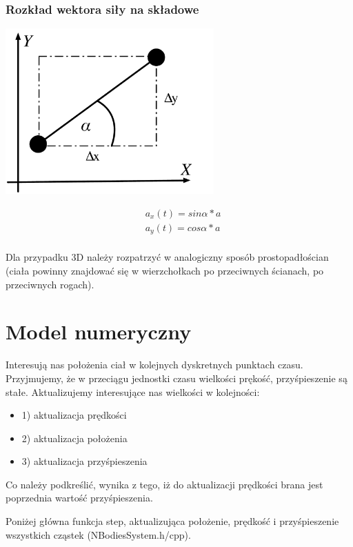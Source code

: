 \documentclass[fleqn]{article}
\begin{document}
\begin{frame}
\frametitle{Rozkład wektora siły na składowe}
\begin{center}
\includegraphics[width=8cm]{rozkladsil.pdf}
\end{center}
\end{frame}

\begin{align*}
    &a_{x}(t) = sin\alpha * a \\
    &a_{y}(t) = cos\alpha * a \\
\end{align*}

Dla przypadku 3D należy rozpatrzyć w analogiczny sposób prostopadłościan (ciała powinny znajdować się w wierzchołkach po przeciwnych ścianach, po przeciwnych rogach).

\section{Model numeryczny}
Interesują nas położenia ciał w kolejnych dyskretnych punktach czasu. Przyjmujemy, że w przeciągu jednostki czasu wielkości prękość, przyśpieszenie są stałe. Aktualizujemy interesujące nas wielkości w kolejności:
\begin{itemize}
    \item 1) aktualizacja prędkości
    \item 2) aktualizacja położenia
    \item 3) aktualizacja przyśpieszenia
\end{itemize}

Co należy podkreślić, wynika z tego, iż do aktualizacji prędkości brana jest poprzednia wartość przyśpieszenia.

Poniżej główna funkcja step, aktualizująca położenie, prędkość i przyśpieszenie wszystkich cząstek (NBodiesSystem.h/cpp).
\end{document}
